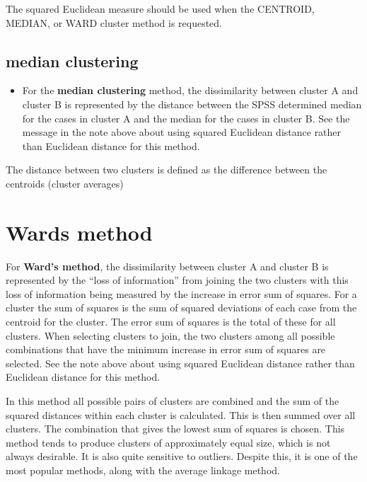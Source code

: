 \documentclass[a4paper,12pt]{article}
\begin{document}
	
	
	\begin{framed}
		The squared Euclidean measure should be used when the CENTROID, MEDIAN, or WARD cluster method is requested.
	\end{framed}
	
\subsection{median clustering}

\begin{itemize}
	
	

	
	\item 
	For the \textbf{median clustering} method, the dissimilarity between cluster A and cluster B is represented by the distance between the SPSS determined median for the cases in cluster A and the median for the cases in cluster B.  See the message in the note above about using squared Euclidean distance rather than Euclidean distance for this method.
	
\end{itemize}

The distance between two clusters is defined as the
difference between the centroids (cluster averages)

\newpage
\section{Wards method}

For \textbf{Ward’s method}, the dissimilarity between cluster A and cluster B is represented by the “loss of information” from joining the two clusters with this loss of information being measured by the increase in error sum of squares.  For a cluster the sum of squares is the sum of squared deviations of each case from the centroid for the cluster.  The error sum of squares is the total of these for all clusters.  When selecting clusters to join, the two clusters among all possible combinations that have the minimum increase in error sum of squares are selected.  See the note above about using squared Euclidean distance rather than Euclidean distance for this method.



In this method all possible pairs of clusters are combined and the sum of the squared
distances within each cluster is calculated. This is then summed over all clusters. The
combination that gives the lowest sum of squares is chosen. This method tends to
produce clusters of approximately equal size, which is not always desirable. It is also
quite sensitive to outliers. Despite this, it is one of the most popular methods, along
with the average linkage method.
\end{document}
